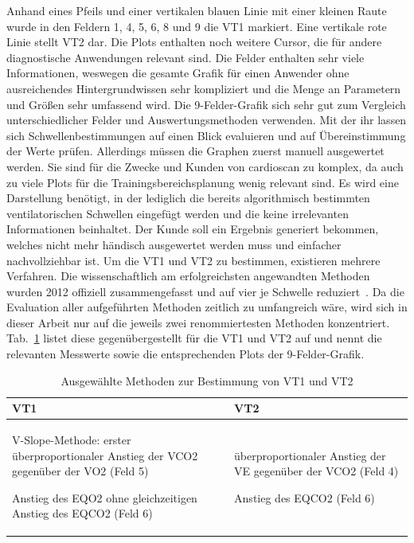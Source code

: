 Anhand eines Pfeils und einer vertikalen blauen Linie mit einer kleinen Raute wurde in den Feldern 1, 4, 5, 6, 8 und 9 die VT1 markiert. Eine vertikale rote Linie stellt VT2 dar. Die Plots enthalten noch weitere Cursor, die für andere diagnostische Anwendungen relevant sind. Die Felder enthalten sehr viele Informationen, weswegen die gesamte Grafik für einen Anwender ohne ausreichendes Hintergrundwissen sehr kompliziert und die Menge an Parametern und Größen sehr umfassend wird. Die 9-Felder-Grafik sich sehr gut zum Vergleich unterschiedlicher Felder und Auswertungsmethoden verwenden. Mit der ihr lassen sich Schwellenbestimmungen auf einen Blick evaluieren und auf Übereinstimmung der Werte prüfen. Allerdings müssen die Graphen zuerst manuell ausgewertet werden. Sie sind für die Zwecke und Kunden von cardioscan zu komplex, da auch zu viele Plots für die Trainingsbereichsplanung wenig relevant sind. Es wird eine Darstellung benötigt, in der lediglich die bereits algorithmisch bestimmten ventilatorischen Schwellen eingefügt werden und die keine irrelevanten Informationen beinhaltet. Der Kunde soll ein Ergebnis generiert bekommen, welches nicht mehr händisch ausgewertet werden muss und einfacher nachvollziehbar ist. Um die VT1 und VT2 zu bestimmen, existieren mehrere Verfahren. Die wissenschaftlich am erfolgreichsten angewandten Methoden wurden 2012 offiziell zusammengefasst und auf vier je Schwelle reduziert~\cite{Westhoff.2012}. Da die Evaluation aller aufgeführten Methoden zeitlich zu umfangreich wäre, wird sich in dieser Arbeit nur auf die jeweils zwei renommiertesten Methoden konzentriert. Tab.~\ref{tab:tabelle2} listet diese gegenübergestellt für die VT1 und VT2 auf und nennt die relevanten Messwerte sowie die entsprechenden Plots der 9-Felder-Grafik.
%
\begin{table}[H]
	\centering
	\caption{Ausgewählte Methoden zur Bestimmung von VT1 und VT2}
	\medskip
	\begin{tabularx}{\textwidth}{X X}
		\toprule
		\textbf{VT1} & \textbf{VT2} \\
		\midrule
		\midrule
		\begin{titemize}
			\item V-Slope-Methode: erster überproportionaler Anstieg der \acs{VCO2} gegenüber der \acs{VO2} (Feld 5)
			\item Anstieg des \ac{EQO2} ohne gleichzeitigen Anstieg des \ac{EQCO2} (Feld 6)
		\end{titemize}
		&\begin{titemize}
			\item überproportionaler Anstieg der \acs{VE} gegenüber der \acs{VCO2} (Feld 4)
			\item Anstieg des \ac{EQCO2} (Feld 6)
		\end{titemize}\\
		\bottomrule
	\end{tabularx}
	\label{tab:tabelle2}
\end{table}
%
